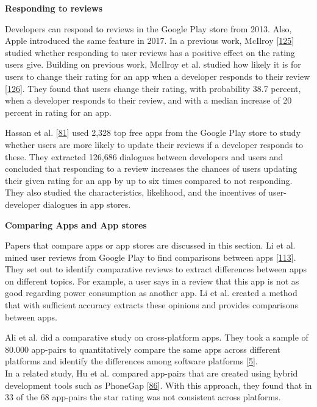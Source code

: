 \documentclass[]{book}
\begin{document}
\textbf{Responding to reviews}

Developers can respond to reviews in the Google Play store from 2013.
Also, Apple introduced the same feature in 2017. In a previous work,
McIlroy {[}\protect\hyperlink{ref-mcilroy2014empirical}{125}{]} studied
whether responding to user reviews has a positive effect on the rating
users give. Building on previous work, McIlroy et al. studied how likely
it is for users to change their rating for an app when a developer
responds to their review
{[}\protect\hyperlink{ref-mcilroy2017worth}{126}{]}. They found that
users change their rating, with probability 38.7 percent, when a
developer responds to their review, and with a median increase of 20
percent in rating for an app.

Hassan et al. {[}\protect\hyperlink{ref-hassan2018studying}{81}{]} used
2,328 top free apps from the Google Play store to study whether users
are more likely to update their reviews if a developer responds to
these. They extracted 126,686 dialogues between developers and users and
concluded that responding to a review increases the chances of users
updating their given rating for an app by up to six times compared to
not responding. They also studied the characteristics, likelihood, and
the incentives of user-developer dialogues in app stores.

\textbf{Comparing Apps and App stores}

Papers that compare apps or app stores are discussed in this section. Li
et al. mined user reviews from Google Play to find comparisons between
apps {[}\protect\hyperlink{ref-li2017mining}{113}{]}. They set out to
identify comparative reviews to extract differences between apps on
different topics. For example, a user says in a review that this app is
not as good regarding power consumption as another app. Li et al.
created a method that with sufficient accuracy extracts these opinions
and provides comparisons between apps.

Ali et al. did a comparative study on cross-platform apps. They took a
sample of 80.000 app-pairs to quantitatively compare the same apps
across different platforms and identify the differences among software
platforms {[}\protect\hyperlink{ref-ali2017same}{5}{]}.\\
In a related study, Hu et al. compared app-pairs that are created using
hybrid development tools such as PhoneGap
{[}\protect\hyperlink{ref-hu2018studying}{86}{]}. With this approach,
they found that in 33 of the 68 app-pairs the star rating was not
consistent across platforms.
\end{document}
